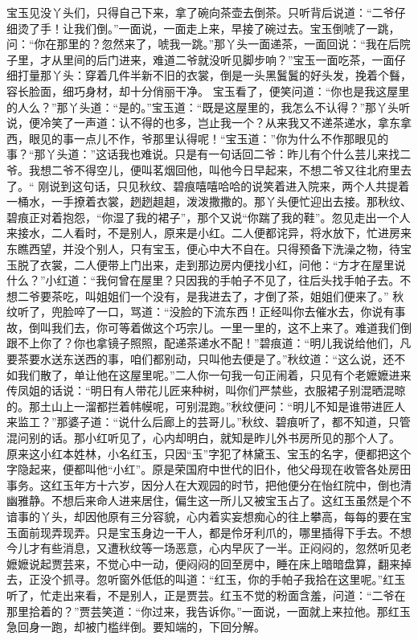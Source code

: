 \documentclass[12pt,oneside]{book}
\begin{document}
宝玉见没丫头们，只得自己下来，拿了碗向茶壶去倒茶。只听背后说道：“二爷仔细烫了手！让我们倒。”一面说，一面走上来，早接了碗过去。宝玉倒唬了一跳，问：“你在那里的？忽然来了，唬我一跳。”那丫头一面递茶，一面回说：“我在后院子里，才从里间的后门进来，难道二爷就没听见脚步响？”宝玉一面吃茶，一面仔细打量那丫头：穿着几件半新不旧的衣裳，倒是一头黑鬒鬒的好头发，挽着个䰖，容长脸面，细巧身材，却十分俏丽干净。
宝玉看了，便笑问道：“你也是我这屋里的人么？”那丫头道：“是的。”宝玉道：“既是这屋里的，我怎么不认得？”那丫头听说，便冷笑了一声道：认不得的也多，岂止我一个？从来我又不递茶递水，拿东拿西，眼见的事一点儿不作，爷那里认得呢！“宝玉道：”你为什么不作那眼见的事？“那丫头道：”这话我也难说。只是有一句话回二爷：昨儿有个什么芸儿来找二爷。我想二爷不得空儿，便叫茗烟回他，叫他今日早起来，不想二爷又往北府里去了。“
刚说到这句话，只见秋纹、碧痕嘻嘻哈哈的说笑着进入院来，两个人共提着一桶水，一手撩着衣裳，趔趔趄趄，泼泼撒撒的。那丫头便忙迎出去接。那秋纹、碧痕正对着抱怨，“你湿了我的裙子”，那个又说“你踹了我的鞋”。忽见走出一个人来接水，二人看时，不是别人，原来是小红。二人便都诧异，将水放下，忙进房来东瞧西望，并没个别人，只有宝玉，便心中大不自在。只得预备下洗澡之物，待宝玉脱了衣裳，二人便带上门出来，走到那边房内便找小红，问他：“方才在屋里说什么？”小红道：“我何曾在屋里？只因我的手帕子不见了，往后头找手帕子去。不想二爷要茶吃，叫姐姐们一个没有，是我进去了，才倒了茶，姐姐们便来了。”
秋纹听了，兜脸啐了一口，骂道：“没脸的下流东西！正经叫你去催水去，你说有事故，倒叫我们去，你可等着做这个巧宗儿。一里一里的，这不上来了。难道我们倒跟不上你了？你也拿镜子照照，配递茶递水不配！”碧痕道：“明儿我说给他们，凡要茶要水送东送西的事，咱们都别动，只叫他去便是了。”秋纹道：“这么说，还不如我们散了，单让他在这屋里呢。”二人你一句我一句正闹着，只见有个老嬷嬷进来传凤姐的话说：“明日有人带花儿匠来种树，叫你们严禁些，衣服裙子别混晒混晾的。那土山上一溜都拦着帏幙呢，可别混跑。”秋纹便问：“明儿不知是谁带进匠人来监工？”那婆子道：“说什么后廊上的芸哥儿。”秋纹、碧痕听了，都不知道，只管混问别的话。那小红听见了，心内却明白，就知是昨儿外书房所见的那个人了。
原来这小红本姓林，小名红玉，只因“玉”字犯了林黛玉、宝玉的名字，便都把这个字隐起来，便都叫他“小红”。原是荣国府中世代的旧仆，他父母现在收管各处房田事务。这红玉年方十六岁，因分人在大观园的时节，把他便分在怡红院中，倒也清幽雅静。不想后来命人进来居住，偏生这一所儿又被宝玉占了。这红玉虽然是个不谙事的丫头，却因他原有三分容貌，心内着实妄想痴心的往上攀高，每每的要在宝玉面前现弄现弄。只是宝玉身边一干人，都是伶牙利爪的，哪里插得下手去。不想今儿才有些消息，又遭秋纹等一场恶意，心内早灰了一半。正闷闷的，忽然听见老嬷嬷说起贾芸来，不觉心中一动，便闷闷的回至房中，睡在床上暗暗盘算，翻来掉去，正没个抓寻。忽听窗外低低的叫道：“红玉，你的手帕子我拾在这里呢。”红玉听了，忙走出来看，不是别人，正是贾芸。红玉不觉的粉面含羞，问道：“二爷在那里拾着的？”贾芸笑道：“你过来，我告诉你。”一面说，一面就上来拉他。那红玉急回身一跑，却被门槛绊倒。要知端的，下回分解。
\end{document}
